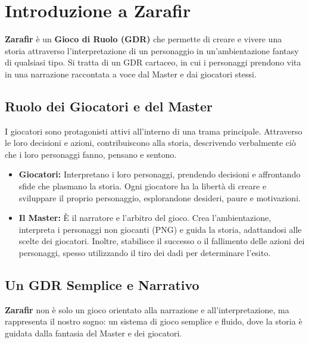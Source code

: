 \documentclass[../manuale_main.tex]{subfiles}
\begin{document}
\section{Introduzione a Zarafir}

\textbf{Zarafir} è un \textbf{Gioco di Ruolo (GDR)} che permette di creare e vivere una storia attraverso l’interpretazione di un personaggio in un’ambientazione fantasy di qualsiasi tipo. Si tratta di un GDR cartaceo, in cui i personaggi prendono vita in una narrazione raccontata a voce dal Master e dai giocatori stessi.

\vspace{0.3cm}

\subsection{Ruolo dei Giocatori e del Master}
I giocatori sono protagonisti attivi all’interno di una trama principale. Attraverso le loro decisioni e azioni, contribuiscono alla storia, descrivendo verbalmente ciò che i loro personaggi fanno, pensano e sentono. 

\begin{itemize}
    \item \textbf{Giocatori:} Interpretano i loro personaggi, prendendo decisioni e affrontando sfide che plasmano la storia. Ogni giocatore ha la libertà di creare e sviluppare il proprio personaggio, esplorandone desideri, paure e motivazioni.
    
    \item \textbf{Il Master:} È il narratore e l’arbitro del gioco. Crea l’ambientazione, interpreta i personaggi non giocanti (PNG) e guida la storia, adattandosi alle scelte dei giocatori. Inoltre, stabilisce il successo o il fallimento delle azioni dei personaggi, spesso utilizzando il tiro dei dadi per determinare l'esito.
\end{itemize}

\vspace{0.3cm}

\subsection{Un GDR Semplice e Narrativo}
\textbf{Zarafir} non è solo un gioco orientato alla narrazione e all’interpretazione, ma rappresenta il nostro sogno: un sistema di gioco semplice e fluido, dove la storia è guidata dalla fantasia del Master e dei giocatori. 
\end{document}
